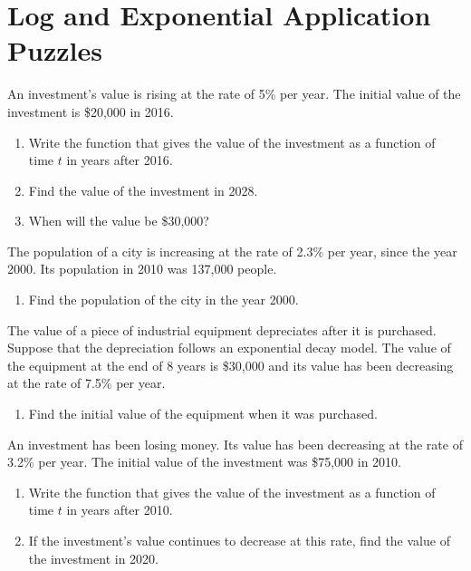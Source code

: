 \section{Log and Exponential Application Puzzles}

\begin{puzzle}
    An investment's value is rising at the rate of 5\% per year. The initial value of the investment is \$20,000 in 2016.
    \begin{enumerate}
        \item Write the function that gives the value of the investment as a function of time \( t \) in years after 2016.
        \item Find the value of the investment in 2028.
        \item When will the value be \$30,000?
    \end{enumerate}
\end{puzzle}

\begin{puzzle}
    The population of a city is increasing at the rate of 2.3\% per year, since the year 2000. Its population in 2010 was 137,000 people.
    \begin{enumerate}
        \item Find the population of the city in the year 2000.
    \end{enumerate}
\end{puzzle}

\begin{puzzle}
    The value of a piece of industrial equipment depreciates after it is purchased. Suppose that the depreciation follows an exponential decay model. The value of the equipment at the end of 8 years is \$30,000 and its value has been decreasing at the rate of 7.5\% per year.
    \begin{enumerate}
        \item Find the initial value of the equipment when it was purchased.
    \end{enumerate}
\end{puzzle}

\begin{puzzle}
    An investment has been losing money. Its value has been decreasing at the rate of 3.2\% per year. The initial value of the investment was \$75,000 in 2010.
    \begin{enumerate}
        \item Write the function that gives the value of the investment as a function of time \( t \) in years after 2010.
        \item If the investment's value continues to decrease at this rate, find the value of the investment in 2020.
    \end{enumerate}
\end{puzzle}

